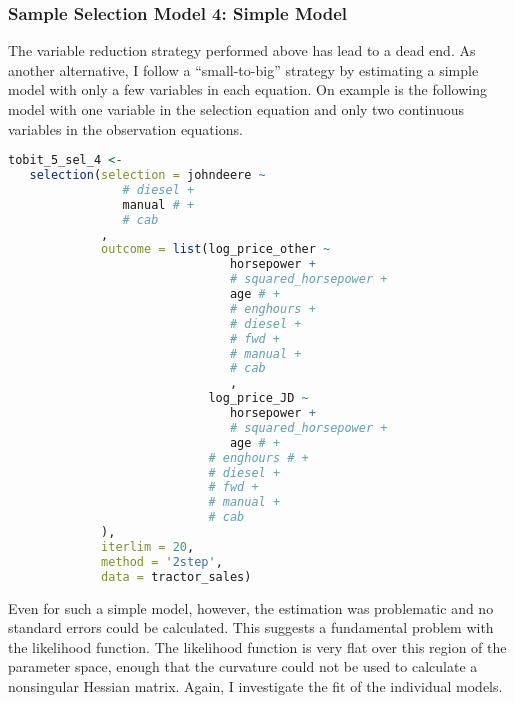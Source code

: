 \documentclass[11pt]{paper}
\begin{document}
\subsubsection{Sample Selection Model 4: Simple Model}

The variable reduction strategy performed above has lead to a dead end. 
As another alternative, I follow a ``small-to-big'' strategy
by estimating a simple model with only a few variables in each equation. 
On example is the following model with one variable in the selection equation
and only two continuous variables in the observation equations.

\begin{lstlisting}[language=R]
tobit_5_sel_4 <-
   selection(selection = johndeere ~
                # diesel +
                manual # +
                # cab
             ,
             outcome = list(log_price_other ~
                               horsepower +
                               # squared_horsepower +
                               age # +
                               # enghours +
                               # diesel +
                               # fwd +
                               # manual +
                               # cab
                               ,
                            log_price_JD ~
                               horsepower +
                               # squared_horsepower +
                               age # +
                            # enghours # +
                            # diesel +
                            # fwd +
                            # manual +
                            # cab
             ),
             iterlim = 20,
             method = '2step',
             data = tractor_sales)
\end{lstlisting}

Even for such a simple model, however, 
the estimation was problematic and no standard errors could be calculated. 
This suggests a fundamental problem with the likelihood function. 
The likelihood function is very flat over this region of the parameter space, 
enough that the curvature could not be used to calculate a nonsingular Hessian matrix. 
Again, I investigate the fit of the individual models.
\end{document}

